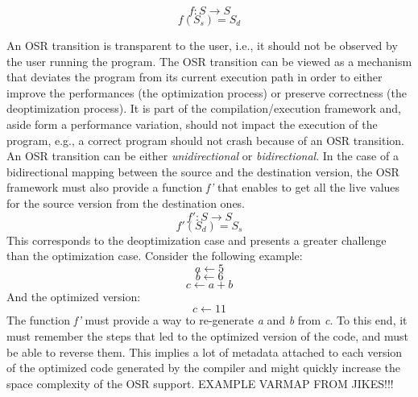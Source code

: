 \[f: S \rightarrow S\]
\[f(S_s) = S_d\]

An OSR transition is transparent to the user, i.e., it should not be observed by the user running the program.
The OSR transition can be viewed as a mechanism that deviates the program from its current execution path in order to either improve the performances (the optimization process) or preserve correctness (the deoptimization process).
It is part of the compilation/execution framework and, aside form a performance variation, should not impact the execution of the program, e.g., a correct program should not crash because of an OSR transition.\\

An OSR transition can be either \textit{unidirectional} or \textit{bidirectional}.
In the case of a bidirectional mapping between the source and the destination version, the OSR framework must also provide a function \textit{f'} that enables to get all the live values for the source version from the destination ones.  
\[f': S \rightarrow S\]
\[f'(S_d) = S_s\]
This corresponds to the deoptimization case and presents a greater challenge than the optimization case.
Consider the following example: 
\[a \leftarrow 5\]
\[b \leftarrow 6\]
\[c \leftarrow a + b\]
And the optimized version:
\[c \leftarrow 11\]
The function \textit{f'} must provide a way to re-generate \textit{a} and \textit{b} from \textit{c}. 
To this end, it must remember the steps that led to the optimized version of the code, and must be able to reverse them.
This implies a lot of metadata attached to each version of the optimized code generated by the compiler and might quickly increase the space complexity of the OSR support.
EXAMPLE VARMAP FROM JIKES!!! 

